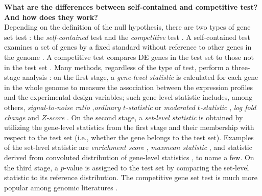 \documentclass[a4,center,fleqn]{NAR}
\begin{document}
	\textbf{What are the differences between self-contained and competitive test? And how does they
		work?}\\
	Depending on the definition of the null hypothesis, there are two types of gene set test
	\citep{goeman2007analyzing}: the \textit{self-contained} test and the \textit{competitive} test . A
	self-contained test examines a set of genes by a fixed standard without reference to other genes in
	the genome \citep{goeman2004global,goeman2005testing,tsai2009multivariate,wu2010roast,huang2013gene}. A competitive test compares DE genes in the test set to those not in the test set \citep{tian2005discovering,wu2012camera,yaari2013quantitative}. Many methods, regardless of the type of test, perform a three-stage analysis
	\citep{khatri2012ten}: on the first stage, a \textit{gene-level statistic} is calculated for each
	gene in the whole genome to measure the association between the expression profiles and the
	experimental design variables; such gene-level statistic includes, among others,
	\textit{signal-to-noise ratio} \citep{subramanian2005gene},\textit{ordinary $t$-statistic}
	\citep{tian2005discovering} or \textit{moderated $t$-statistic} \citep{Smyth2004moderated},
	\textit{log fold change} \citep{kim2005page} and \textit{$Z$-score} \citep{efron2007correlation}. On
	the second stage, a \textit{set-level statistic} is obtained by utilizing the gene-level statistics
	from the first stage and their membership with respect to the test set (i.e., whether the gene
	belongs to the test set). Examples of the set-level statistic are \textit{enrichment score}
	\citep{subramanian2005gene}, \textit{maxmean statistic} \citep{efron2007testing}, and statistic
	derived from convoluted distribution of gene-level statistics \citep{yaari2013quantitative}, to name
	a few. On the third stage, a $p$-value is assigned to the test set by comparing the set-level
	statistic to its reference distribution. The competitive gene set test is much more popular among
	genomic literatures \citep{goeman2007analyzing, gatti2010heading}.  
	
	
\end{document}
